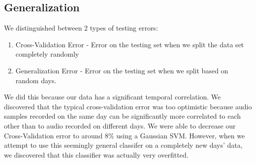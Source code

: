 \documentclass[journal]{IEEEtran}
\begin{document}
\subsection{Generalization}
We distinguished between 2 types of testing errors:
\begin{enumerate}
\item Cross-Validation Error - Error on the testing set when we split the data set completely randomly
\item Generalization Error - Error on the testing set when we split based on random days.
\end{enumerate}
We did this because our data has a significant temporal correlation. We discovered that the typical cross-validation error was too optimistic because audio samples recorded on the same day can be significantly more correlated to each other than to audio recorded on different days. We were able to decrease our Cross-Validation error to around 8\% using a Gaussian SVM. However, when we attempt to use this seemingly general classifer on a completely new days' data, we discovered that this classifier was actually very overfitted. 
\end{document}
